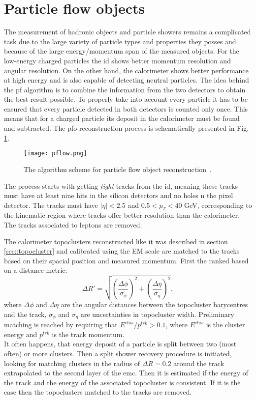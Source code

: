       \section{Particle flow objects}
      \label{sec:pfo}
      The measurement of hadronic objects and particle showers remains a complicated task due to the large variety of particle types and properties they posses and because of the large energy/momentum span of the measured objects. For the low-energy charged particles the \gls{id} shows better momentum resolution and angular resolution. On the other hand, the calorimeter shows better performance at high energy and is also capable of detecting neutral particles. The idea behind the \gls{pf} algorithm \cite{pflow} is to combine the information from the two detectors to obtain the best result possible. To properly take into account every particle it has to be ensured that every particle detected in both detectors is counted only once. This means that for a charged particle its deposit in the calorimeter must be found and subtracted. The \gls{pfo} reconstruction process is schematically presented in Fig. \ref{fig::pflow}.
      	\begin{figure}[htbp]
      	\centering
      	\texttt{[image: pflow.png]}
      	\caption[pflow]{The algorithm scheme for particle flow object reconstruction~\cite{pflow}.}
      	\label{fig::pflow}
      \end{figure}
  	  The process starts with getting \textit{tight} tracks from the \gls{id}, meaning these tracks must have at least nine hits in the silicon detectors and no holes n the pixel detector. The tracks must have $|\eta| < 2.5$ and $0.5 < p_T < 40$ GeV, corresponding to the kinematic region where tracks offer better resolution than the calorimeter. The tracks associated to leptons are removed. 
  	  
  	  The calorimeter topoclusters reconstructed like it was described in section \ref{sec::topocluster} and calibrated using the EM scale are matched to the tracks based on their spacial position and measured momentum. First the ranked based on a distance metric:
  	  	\begin{equation}
  	  \Delta R'=\sqrt{\left(\frac{\Delta \phi}{\sigma_{\phi}}\right)^2+\left(\frac{\Delta \eta}{\sigma_{\eta}}\right)^2},
  	  \end{equation}
  	  where $\Delta \phi$ and $\Delta \eta$ are the angular distances between the topocluster barycentres and the track, $\sigma_{\phi}$ and $\sigma_{\eta}$ are uncertainties in topocluster width. Preliminary matching is reached by requiring that $E^{clus}/p^{trk}>0.1$, where $E^{clus}$ is the cluster energy and $p^{trk}$ is the track momentum.\\
  	  It often happens, that energy deposit of a particle is split between two (most often) or more clusters. Then a split shower recovery procedure is initiated, looking for matching clusters in the radius of $\Delta R = 0.2$ around the track extrapolated to the second layer of the \gls{emc}. Then it is estimated if the energy of the track and the energy of the associated topocluster is consistent. If it is the case then the topoclusters matched to the tracks are removed. 
  	  
